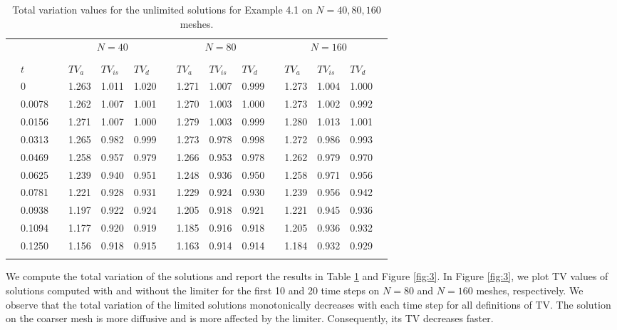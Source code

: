 \documentclass[reqno,a4paper,12pt]{amsart}
\begin{document}
\begin{table}[htb!]
    \centering
    \begin{tabular}{@{}clclllclllclllc@{}}
        \toprule
        & & {} & \multicolumn{3}{c}{$N = 40$} & {} & \multicolumn{3}{c}{$N = 80$} & {} & \multicolumn{3}{c}{$N = 160$} \\
        \cmidrule{4-6} \cmidrule{8-10} \cmidrule{12-14} \\
        & $t$ & {} & $TV_a$ & $TV_{is}$ & $TV_{d}$ & {} & $TV_a$ & $TV_{is}$ & $TV_{d}$ & {} & $TV_a$ & $TV_{is}$ & $TV_{d}$ & \\
        \midrule
        & 0      & {} & 1.263 & 1.011 & 1.020 & {} & 1.271 & 1.007 & 0.999 & {} & 1.273 & 1.004 & 1.000 & \\
        & 0.0078 & {} & 1.262 & 1.007 & 1.001 & {} & 1.270 & 1.003 & 1.000 & {} & 1.273 & 1.002 & 0.992 & \\
        & 0.0156 & {} & 1.271 & 1.007 & 1.000 & {} & 1.279 & 1.003 & 0.999 & {} & 1.280 & 1.013 & 1.001 & \\
        & 0.0313 & {} & 1.265 & 0.982 & 0.999 & {} & 1.273 & 0.978 & 0.998 & {} & 1.272 & 0.986 & 0.993 & \\
        & 0.0469 & {} & 1.258 & 0.957 & 0.979 & {} & 1.266 & 0.953 & 0.978 & {} & 1.262 & 0.979 & 0.970 & \\
        & 0.0625 & {} & 1.239 & 0.940 & 0.951 & {} & 1.248 & 0.936 & 0.950 & {} & 1.258 & 0.971 & 0.956 & \\
        & 0.0781 & {} & 1.221 & 0.928 & 0.931 & {} & 1.229 & 0.924 & 0.930 & {} & 1.239 & 0.956 & 0.942 & \\
        & 0.0938 & {} & 1.197 & 0.922 & 0.924 & {} & 1.205 & 0.918 & 0.921 & {} & 1.221 & 0.945 & 0.936 & \\
        & 0.1094 & {} & 1.177 & 0.920 & 0.919 & {} & 1.185 & 0.916 & 0.918 & {} & 1.205 & 0.936 & 0.932 & \\
        & 0.1250 & {} & 1.156 & 0.918 & 0.915 & {} & 1.163 & 0.914 & 0.914 & {} & 1.184 & 0.932 & 0.929 & \\
        \bottomrule\\
    \end{tabular}
    \caption{Total variation values for the unlimited solutions for Example 4.1 on $N = 40,80,160$ meshes.}
    \label{table:2}
\end{table}

We compute the total variation of the solutions and report the results in Table \ref{table:2} and Figure \ref{fig:3}. In Figure \ref{fig:3}, we plot TV values of solutions computed with and without the limiter for the first 10 and 20 time steps on $N = 80$ and $N = 160$ meshes, respectively. We observe that the total variation of the limited solutions monotonically decreases with each time step for all definitions of TV. The solution on the coarser mesh is more diffusive and is more affected by the limiter.  Consequently, its TV decreases faster. 
\end{document}
